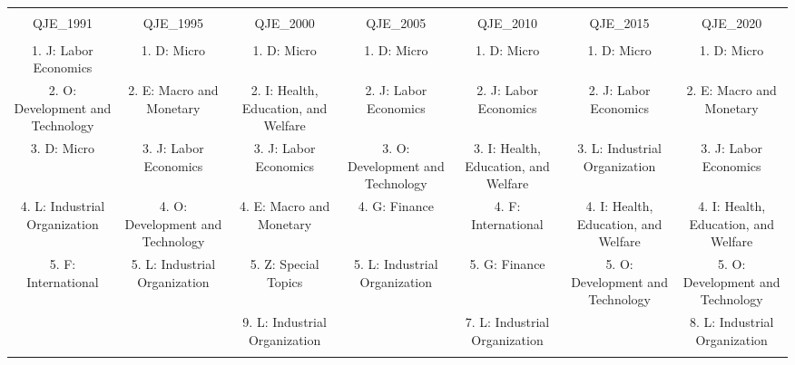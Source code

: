 
\begin{table}[!htbp] \centering 
  \caption{} 
  \label{} 
\scriptsize 
\begin{tabular}{@{\extracolsep{5pt}} ccccccc} 
\\[-1.8ex]\hline 
\hline \\[-1.8ex] 
QJE\_1991 & QJE\_1995 & QJE\_2000 & QJE\_2005 & QJE\_2010 & QJE\_2015 & QJE\_2020 \\ 
\hline \\[-1.8ex] 
1. J: Labor Economics & 1. D: Micro & 1. D: Micro & 1. D: Micro & 1. D: Micro & 1. D: Micro & 1. D: Micro \\ 
2. O: Development and Technology & 2. E: Macro and Monetary & 2. I: Health, Education, and Welfare & 2. J: Labor Economics & 2. J: Labor Economics & 2. J: Labor Economics & 2. E: Macro and Monetary \\ 
3. D: Micro & 3. J: Labor Economics & 3. J: Labor Economics & 3. O: Development and Technology & 3. I: Health, Education, and Welfare & 3. L: Industrial Organization & 3. J: Labor Economics \\ 
4. L: Industrial Organization & 4. O: Development and Technology & 4. E: Macro and Monetary & 4. G: Finance & 4. F: International & 4. I: Health, Education, and Welfare & 4. I: Health, Education, and Welfare \\ 
5. F: International & 5. L: Industrial Organization & 5. Z: Special Topics & 5. L: Industrial Organization & 5. G: Finance & 5. O: Development and Technology & 5. O: Development and Technology \\ 
 &  & 9. L: Industrial Organization &  & 7. L: Industrial Organization &  & 8. L: Industrial Organization \\ 
\hline \\[-1.8ex] 
\end{tabular} 
\end{table} 
